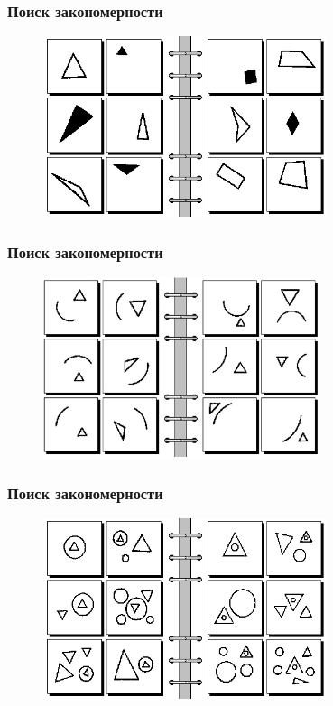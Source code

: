 \documentclass[12pt]{beamer}
\begin{document}
\begin{frame}\frametitle{Поиск закономерности}
\begin{figure}[htbp]
  \includegraphics[height=150pt, keepaspectratio = true]{images/bongard6}   
\end{figure}
\end{frame}

\begin{frame}\frametitle{Поиск закономерности}
\begin{figure}[htbp]
  \includegraphics[height=150pt, keepaspectratio = true]{images/bongard40}   
\end{figure}
\end{frame}

\begin{frame}\frametitle{Поиск закономерности}
\begin{figure}[htbp]
  \includegraphics[height=150pt, keepaspectratio = true]{images/bongard47}   
\end{figure}
\end{frame}
\end{document}
